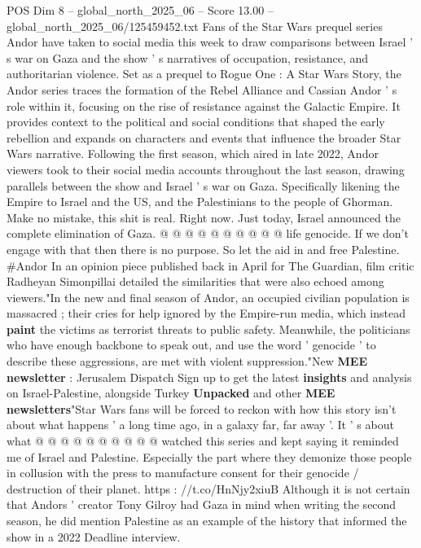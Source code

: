 \begin{textsample}{POS Dim 8 – global\_north\_2025\_06 – Score 13.00 – global\_north\_2025\_06/125459452.txt}  \label{ex:f8_pos_045}
Fans of the Star Wars prequel series Andor have taken to social media this week to draw comparisons between Israel ' s war on Gaza and the show ' s narratives of occupation, resistance, and authoritarian violence.
Set as a prequel to Rogue One : A Star Wars Story, the Andor series traces the formation of the Rebel Alliance and Cassian Andor ' s role within it, focusing on the rise of resistance against the Galactic Empire.
It provides context to the political and social conditions that shaped the early rebellion and expands on characters and events that influence the broader Star Wars narrative.
Following the first season, which aired in late 2022, Andor viewers took to their social media accounts throughout the last season, drawing parallels between the show and Israel ' s war on Gaza.
Specifically likening the Empire to Israel and the US, and the Palestinians to the people of Ghorman.
Make no mistake, this shit is real.
Right now.
Just today, Israel announced the complete elimination of Gaza. @ @ @ @ @ @ @ @ @ @ life genocide.
If we don't engage with that then there is no purpose.
So let the aid in and free Palestine. \#Andor In an opinion piece published back in April for The Guardian, film critic Radheyan Simonpillai detailed the similarities that were also echoed among viewers."In the new and final season of Andor, an occupied civilian population is massacred ; their cries for help ignored by the Empire-run media, which instead \textbf{paint} the victims as terrorist threats to public safety.
Meanwhile, the politicians who have enough backbone to speak out, and use the word ' genocide ' to describe these aggressions, are met with violent suppression."New \textbf{MEE} \textbf{newsletter} : Jerusalem Dispatch Sign up to get the latest \textbf{insights} and analysis on Israel-Palestine, alongside Turkey \textbf{Unpacked} and other \textbf{MEE} \textbf{newsletters}"Star Wars fans will be forced to reckon with how this story isn't about what happens ' a long time ago, in a galaxy far, far away '.
It ' s about what @ @ @ @ @ @ @ @ @ @ watched this series and kept saying it reminded me of Israel and Palestine.
Especially the part where they demonize those people in collusion with the press to manufacture consent for their genocide / destruction of their planet. https : //t.co/HnNjy2xiuB Although it is not certain that Andors ' creator Tony Gilroy had Gaza in mind when writing the second season, he did mention Palestine as an example of the history that informed the show in a 2022 Deadline interview.

\end{textsample}
